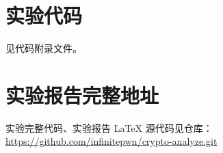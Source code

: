 \clearpage
\appendix
\section{实验代码}
见代码附录文件。%

% 

% 
\section{实验报告完整地址}
实验完整代码、实验报告 \LaTeX{} 源代码见仓库：
\url{https://github.com/infinitepwn/crypto-analyze.git}
